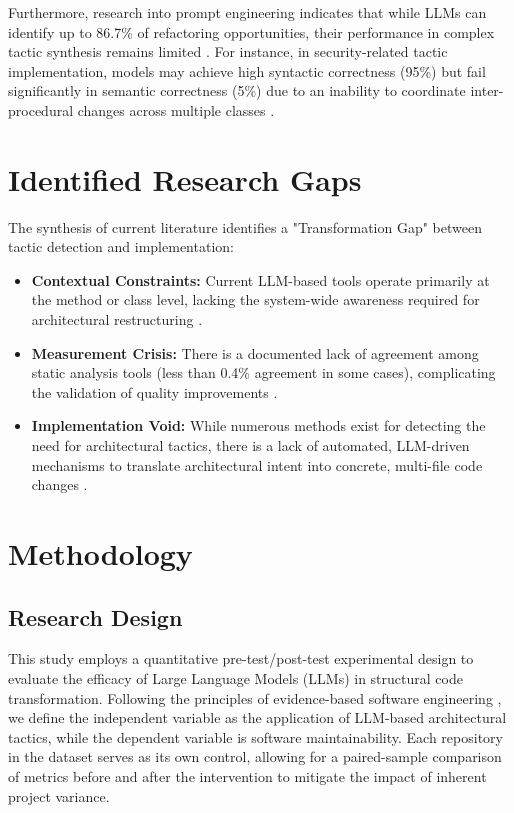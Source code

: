 \documentclass[sigconf,review]{acmart}
\begin{document}
Furthermore, research into prompt engineering indicates that while LLMs can identify up to 86.7\% of refactoring opportunities, their performance in complex tactic synthesis remains limited \cite{liu2025exploring}. For instance, in security-related tactic implementation, models may achieve high syntactic correctness (95\%) but fail significantly in semantic correctness (5\%) due to an inability to coordinate inter-procedural changes across multiple classes \cite{shokri2024ipsynth}.

\section{Identified Research Gaps}
The synthesis of current literature identifies a "Transformation Gap" between tactic detection and implementation:
\begin{itemize}
    \item \textbf{Contextual Constraints:} Current LLM-based tools operate primarily at the method or class level, lacking the system-wide awareness required for architectural restructuring \cite{martinez2025refactoring, horikawa2025agentic}.
    \item \textbf{Measurement Crisis:} There is a documented lack of agreement among static analysis tools (less than 0.4\% agreement in some cases), complicating the validation of quality improvements \cite{lenarduzzi2023critical}.
    \item \textbf{Implementation Void:} While numerous methods exist for detecting the need for architectural tactics, there is a lack of automated, LLM-driven mechanisms to translate architectural intent into concrete, multi-file code changes \cite{marquez2022architectural, shokri2024ipsynth}.
\end{itemize}

\section{Methodology}

\subsection{Research Design}
This study employs a quantitative pre-test/post-test experimental design to evaluate the efficacy of Large Language Models (LLMs) in structural code transformation. Following the principles of evidence-based software engineering \cite{bass2021software}, we define the independent variable as the application of LLM-based architectural tactics, while the dependent variable is software maintainability. Each repository in the dataset serves as its own control, allowing for a paired-sample comparison of metrics before and after the intervention to mitigate the impact of inherent project variance.
\end{document}
